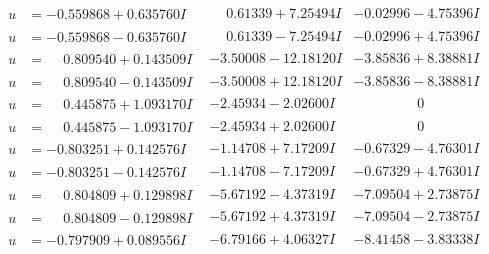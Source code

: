 \documentclass[1p]{elsarticle_modified}
\theoremstyle{definition}
\begin{document}
$$\begin{array}{c|c|c}
 \hline 
\begin{aligned}
u &= -0.559868 + 0.635760 I\end{aligned}
 & \phantom{-}0.61339 + 7.25494 I & -0.02996 - 4.75396 I \\ \hline\begin{aligned}
u &= -0.559868 - 0.635760 I\end{aligned}
 & \phantom{-}0.61339 - 7.25494 I & -0.02996 + 4.75396 I \\ \hline\begin{aligned}
u &= \phantom{-}0.809540 + 0.143509 I\end{aligned}
 & -3.50008 - 12.18120 I & -3.85836 + 8.38881 I \\ \hline\begin{aligned}
u &= \phantom{-}0.809540 - 0.143509 I\end{aligned}
 & -3.50008 + 12.18120 I & -3.85836 - 8.38881 I \\ \hline\begin{aligned}
u &= \phantom{-}0.445875 + 1.093170 I\end{aligned}
 & -2.45934 - 2.02600 I & \phantom{-0.000000 } 0 \\ \hline\begin{aligned}
u &= \phantom{-}0.445875 - 1.093170 I\end{aligned}
 & -2.45934 + 2.02600 I & \phantom{-0.000000 } 0 \\ \hline\begin{aligned}
u &= -0.803251 + 0.142576 I\end{aligned}
 & -1.14708 + 7.17209 I & -0.67329 - 4.76301 I \\ \hline\begin{aligned}
u &= -0.803251 - 0.142576 I\end{aligned}
 & -1.14708 - 7.17209 I & -0.67329 + 4.76301 I \\ \hline\begin{aligned}
u &= \phantom{-}0.804809 + 0.129898 I\end{aligned}
 & -5.67192 - 4.37319 I & -7.09504 + 2.73875 I \\ \hline\begin{aligned}
u &= \phantom{-}0.804809 - 0.129898 I\end{aligned}
 & -5.67192 + 4.37319 I & -7.09504 - 2.73875 I \\ \hline\begin{aligned}
u &= -0.797909 + 0.089556 I\end{aligned}
 & -6.79166 + 4.06327 I & -8.41458 - 3.83338 I \\ \hline\begin{aligned}

\end{aligned}
\end{array}$$
\end{document}
